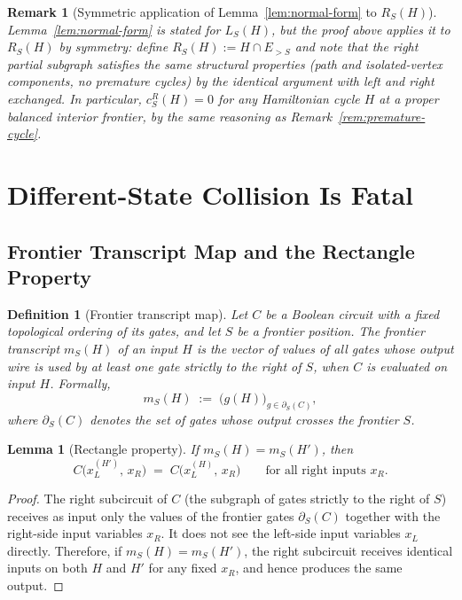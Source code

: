 \documentclass[11pt]{article}
\newtheorem{lemma}[theorem]{Lemma}
\newtheorem{definition}[theorem]{Definition}
\newtheorem{remark}[theorem]{Remark}
\begin{document}
\begin{remark}[Symmetric application of Lemma~\ref{lem:normal-form} to $R_S(H)$]
\label{rem:normal-form-right}
Lemma~\ref{lem:normal-form} is stated for $L_S(H)$, but the proof above applies it to $R_S(H)$
by symmetry: define $R_S(H) := H \cap E_{>S}$ and note that the right partial subgraph satisfies
the same structural properties (path and isolated-vertex components, no premature cycles) by the
identical argument with left and right exchanged.  In particular, $c_S^R(H) = 0$ for any
Hamiltonian cycle $H$ at a proper balanced interior frontier, by the same reasoning as
Remark~\ref{rem:premature-cycle}.
\end{remark}


\section{Different-State Collision Is Fatal}
\label{sec:collision}

\subsection{Frontier Transcript Map and the Rectangle Property}
\label{subsec:frontier-transcript}

\begin{definition}[Frontier transcript map]
\label{def:frontier-transcript}
Let $C$ be a Boolean circuit with a fixed topological ordering of its gates, and let $S$ be a
frontier position.  The \emph{frontier transcript} $m_S(H)$ of an input $H$ is the vector of
values of all gates whose output wire is used by at least one gate strictly to the right of $S$,
when $C$ is evaluated on input $H$.  Formally,
\[
  m_S(H) \;:=\; \bigl(g(H)\bigr)_{g \in \partial_S(C)},
\]
where $\partial_S(C)$ denotes the set of gates whose output crosses the frontier $S$.
\end{definition}

\begin{lemma}[Rectangle property]
\label{lem:rectangle-property}
If $m_S(H) = m_S(H')$, then
\[
  C\!\bigl(x_L^{(H')},\, x_R\bigr) \;=\; C\!\bigl(x_L^{(H)},\, x_R\bigr)
  \qquad \text{for all right inputs } x_R.
\]
\end{lemma}

\begin{proof}
The right subcircuit of $C$ (the subgraph of gates strictly to the right of $S$) receives as
input only the values of the frontier gates $\partial_S(C)$ together with the right-side input
variables $x_R$.  It does not see the left-side input variables $x_L$ directly.  Therefore, if
$m_S(H) = m_S(H')$, the right subcircuit receives identical inputs on both $H$ and $H'$ for any
fixed $x_R$, and hence produces the same output.
\end{proof}
\end{document}
